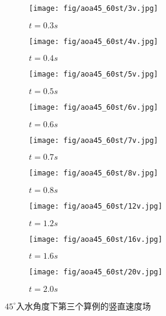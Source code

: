 \begin{figure}[!htp]
  \centering

  \begin{subfigure}{0.25\textwidth}
    \centering
    \texttt{[image: fig/aoa45\_60st/3v.jpg]}
    \caption{$t = 0.3s$}
  \end{subfigure}
  \hspace{1cm}
  \begin{subfigure}{0.25\textwidth}
    \centering
    \texttt{[image: fig/aoa45\_60st/4v.jpg]}
    \caption{$t = 0.4s$}
  \end{subfigure}
  \hspace{1cm}
  \begin{subfigure}{0.25\textwidth}
    \centering
    \texttt{[image: fig/aoa45\_60st/5v.jpg]}
    \caption{$t = 0.5s$}
  \end{subfigure}

  \quad

  \begin{subfigure}{0.25\textwidth}
    \centering
    \texttt{[image: fig/aoa45\_60st/6v.jpg]}
    \caption{$t = 0.6s$}
  \end{subfigure}
  \hspace{1cm}
  \begin{subfigure}{0.25\textwidth}
    \centering
    \texttt{[image: fig/aoa45\_60st/7v.jpg]}
    \caption{$t = 0.7s$}
  \end{subfigure}
  \hspace{1cm}
  \begin{subfigure}{0.25\textwidth}
    \centering
    \texttt{[image: fig/aoa45\_60st/8v.jpg]}
    \caption{$t = 0.8s$}
  \end{subfigure}

  \quad 

  \begin{subfigure}{0.25\textwidth}
    \centering
    \texttt{[image: fig/aoa45\_60st/12v.jpg]}
    \caption{$t = 1.2s$}
  \end{subfigure}
  \hspace{1cm}
  \begin{subfigure}{0.25\textwidth}
    \centering
    \texttt{[image: fig/aoa45\_60st/16v.jpg]}
    \caption{$t = 1.6s$}
  \end{subfigure}
  \hspace{1cm}
  \begin{subfigure}{0.25\textwidth}
    \centering
    \texttt{[image: fig/aoa45\_60st/20v.jpg]}
    \caption{$t = 2.0s$}
  \end{subfigure}

  \caption{$45^\circ$入水角度下第三个算例的竖直速度场}
  \label{fig:detail_45_v}
\end{figure}

